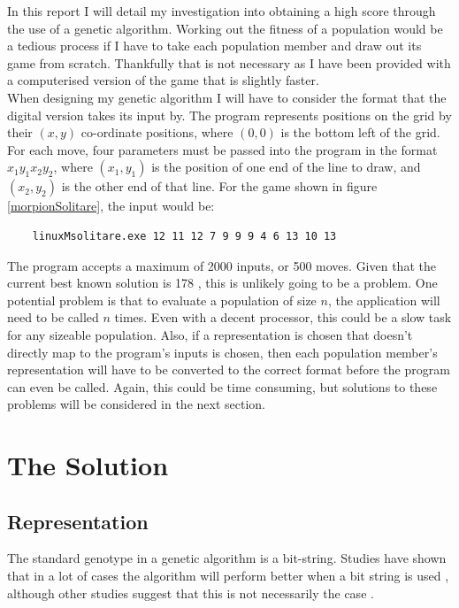 \documentclass[]{report}
\begin{document}
In this report I will detail my investigation into obtaining a high score through the use of a genetic algorithm. Working out the fitness of a population would be a tedious process if I have to take each population member and draw out its game from scratch. Thankfully that is not necessary as I have been provided with a computerised version of the game that is slightly faster.\\

When designing my genetic algorithm I will have to consider the format that the digital version takes its input by. The program represents positions on the grid by their $(x, y)$ co-ordinate positions, where $(0, 0)$ is the bottom left of the grid. For each move, four parameters must be passed into the program in the format $x_1 y_1 x_2 y_2$, where $(x_1, y_1)$ is the position of one end of the line to draw, and $(x_2, y_2)$ is the other end of that line. For the game shown in figure \ref{morpionSolitare}, the input would be:

\begin{verbatim}
	linuxMsolitare.exe 12 11 12 7 9 9 9 4 6 13 10 13
\end{verbatim}

The program accepts a maximum of 2000 inputs, or 500 moves. Given that the current best known solution is 178 \cite{morpionRecord}, this is unlikely going to be a problem. One potential problem is that to evaluate a population of size $n$, the application will need to be called $n$ times. Even with a decent processor, this could be a slow task for any sizeable population. Also, if a representation is chosen that doesn't directly map to the program's inputs is chosen, then each population member's representation will have to be converted to the correct format before the program can even be called. Again, this could be time consuming, but solutions to these problems will be considered in the next section.


\chapter{The Solution}

\section{Representation}

The standard genotype in a genetic algorithm is a bit-string. Studies have shown that in a lot of cases the algorithm will perform better when a bit string is used \cite{something}, although other studies suggest that this is not necessarily the case \cite{somethingElse}.\\
\end{document}
